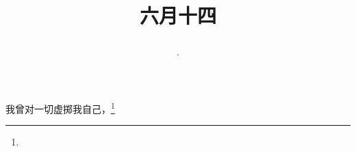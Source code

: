 \title{\date[d=19,m=7,y=2024][year:cn-y,年,month:cn,day:cn,日,·,weekday]·六月十四 }
我曾对一切虚掷我自己，\footnote{ }

